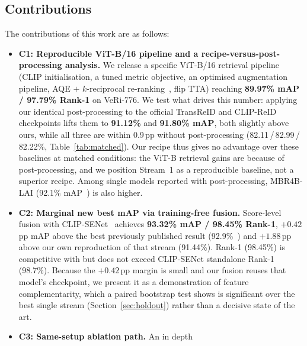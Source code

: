 \subsection{Contributions}
The contributions of this work are as follows:
\begin{itemize}
  \item \textbf{C1: Reproducible ViT-B/16 pipeline and a
    recipe-versus-post-processing analysis.} We release a specific
    ViT-B/16 retrieval pipeline (CLIP initialisation, a tuned metric objective,
    an optimised augmentation pipeline, AQE $+$ $k$-reciprocal
    re-ranking~\cite{zhong2017rerank}, flip TTA) reaching \textbf{89.97\% mAP /
    97.79\% Rank-1} on VeRi-776. We test what drives this
    number: applying our identical post-processing to the official TransReID
    and CLIP-ReID checkpoints lifts them to \textbf{91.12\%} and
    \textbf{91.80\% mAP}, both slightly above ours, while all three
    are within 0.9\,pp without post-processing
    (82.11\,/\,82.99\,/\,82.22\%, Table~\ref{tab:matched}). Our recipe thus
    gives no advantage over these baselines at matched conditions: the ViT-B
    retrieval gains are because of post-processing, and we position
    Stream~1 as a reproducible baseline, not a superior recipe. Among
    single models reported with post-processing, MBR4B-LAI
    (92.1\% mAP~\cite{luo2023mbr4b,mbr4bcode}) is also higher.
  \item \textbf{C2: Marginal new best mAP via training-free fusion.}
    Score-level fusion with CLIP-SENet~\cite{lu2025clipsenet} achieves
    \textbf{93.32\% mAP / 98.45\% Rank-1}, $+0.42$\,pp mAP above the best
    previously published result (92.9\%~\cite{lu2025clipsenet}) and
    $+1.88$\,pp above our own reproduction of that stream (91.44\%). Rank-1
    (98.45\%) is competitive with but does not exceed CLIP-SENet standalone
    Rank-1 (98.7\%). Because the $+0.42$\,pp margin is small and our fusion
    reuses that model's checkpoint, we
    present it as a demonstration of feature complementarity, which a paired
    bootstrap test shows is significant over the best single
    stream (Section~\ref{sec:holdout}) rather
    than a decisive state of the art.
  \item \textbf{C3: Same-setup ablation path.} An in depth

\end{itemize}
